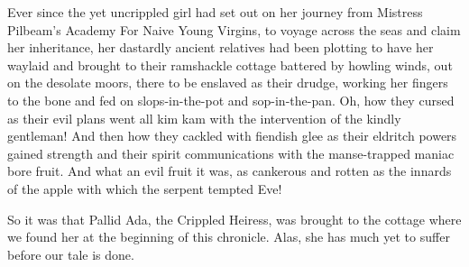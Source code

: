 Ever since the yet uncrippled girl had set out on her journey from Mistress Pilbeam's Academy For Naive Young Virgins, to voyage across the seas and claim her inheritance, her dastardly ancient relatives had been plotting to have her waylaid and brought to their ramshackle cottage battered by howling winds, out on the desolate moors, there to be enslaved as their drudge, working her fingers to the bone and fed on slops-in-the-pot and sop-in-the-pan. Oh, how they cursed as their evil plans went all kim kam with the intervention of the kindly gentleman! And then how they cackled with fiendish glee as their eldritch powers gained strength and their spirit communications with the manse-trapped maniac bore fruit. And what an evil fruit it was, as cankerous and rotten as the innards of the apple with which the serpent tempted Eve!

So it was that Pallid Ada, the Crippled Heiress, was brought to the cottage where we found her at the beginning of this chronicle. Alas, she has much yet to suffer before our tale is done.